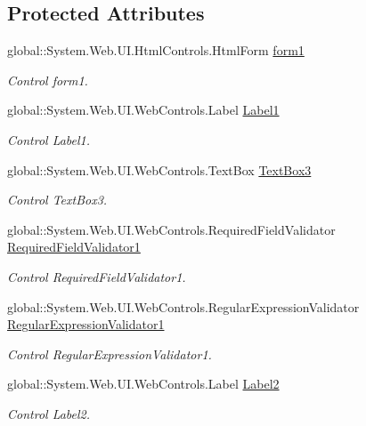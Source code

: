 \subsection*{Protected Attributes}
\begin{DoxyCompactItemize}
\item 
global\+::\+System.\+Web.\+U\+I.\+Html\+Controls.\+Html\+Form \mbox{\hyperlink{class_inicio_1_1_login_a52e65c9e6119c96fb9e7efb178a72214}{form1}}
\begin{DoxyCompactList}\small\item\em Control form1. \end{DoxyCompactList}\item 
global\+::\+System.\+Web.\+U\+I.\+Web\+Controls.\+Label \mbox{\hyperlink{class_inicio_1_1_login_a089c50220a66bcedf279557e235b7fb1}{Label1}}
\begin{DoxyCompactList}\small\item\em Control Label1. \end{DoxyCompactList}\item 
global\+::\+System.\+Web.\+U\+I.\+Web\+Controls.\+Text\+Box \mbox{\hyperlink{class_inicio_1_1_login_af3c872110454773d5d53d83c27e6ccb6}{Text\+Box3}}
\begin{DoxyCompactList}\small\item\em Control Text\+Box3. \end{DoxyCompactList}\item 
global\+::\+System.\+Web.\+U\+I.\+Web\+Controls.\+Required\+Field\+Validator \mbox{\hyperlink{class_inicio_1_1_login_ab86e1edc9ca75591b9305e7c152beb95}{Required\+Field\+Validator1}}
\begin{DoxyCompactList}\small\item\em Control Required\+Field\+Validator1. \end{DoxyCompactList}\item 
global\+::\+System.\+Web.\+U\+I.\+Web\+Controls.\+Regular\+Expression\+Validator \mbox{\hyperlink{class_inicio_1_1_login_aebbbf7080d71a07e72e4be45e42c6795}{Regular\+Expression\+Validator1}}
\begin{DoxyCompactList}\small\item\em Control Regular\+Expression\+Validator1. \end{DoxyCompactList}\item 
global\+::\+System.\+Web.\+U\+I.\+Web\+Controls.\+Label \mbox{\hyperlink{class_inicio_1_1_login_a88ab7f12f1587cb3a0174d4bdc7baa39}{Label2}}
\begin{DoxyCompactList}\small\item\em Control Label2. \end{DoxyCompactList}\item 

\end{DoxyCompactItemize}
